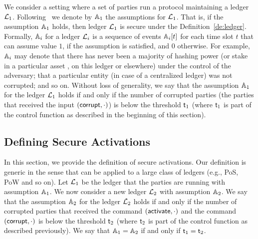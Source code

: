 We consider a setting where a set of parties run a protocol maintaining a ledger $\mathcal{L}_1$. Following~\cite{sidechain} we denote by $\mathbb{A}_1$
the assumptions for $\mathcal{L}_1$.
 That is, if the assumption $\mathbb{A}_1$ holds, then ledger $\mathcal{L}_1$ is secure under the Definition~\ref{de:ledger}.
Formally, $\mathbb{A}_i$ for a ledger $\mathcal{L}_i$ is a sequence of events $\mathbb{A}_i[t]$ for each time slot $t$ that can assume value $1$,
if the assumption is satisfied, and $0$ otherwise.
For example, $\mathbb{A}_i$ may denote that
there has never been a majority of hashing power (or stake in a particular
asset
, on this ledger or elsewhere) under the control of the adversary; that a
particular entity (in case of a centralized ledger) was not corrupted; and so
on.
Without loss of generality, we say that the assumption $\mathbb{A}_1$ for the ledger $\mathcal{L}_1$ holds if and only if the number of corrupted parties (the parties
that received the input $(\mathsf{corrupt}, \cdot)$) is below the threshold $\mathsf{t}_1$ (where $\mathsf{t}_1$ is part of the control function as described in the beginning
of this section).







\subsection{Defining Secure Activations}
In this section, we provide the definition of secure activations. Our definition is generic in the sense that can be applied to a large class of ledgers
(e.g., PoS, PoW and so on).
Let $\mathcal{L}_1$ be the ledger that the parties are running with assumption $\mathbb{A}_1$. We now consider a new ledger $\mathcal{L}_2$ with assumption $\mathbb{A}_2$.
We say that the assumption $\mathbb{A}_2$ for the ledger $\mathcal{L}_2$ holds if and only if the number of corrupted parties
that received the command $(\mathsf{activate}, \cdot)$ and the command $(\mathsf{corrupt},\cdot)$
 is below the threshold $\mathsf{t}_2$ (where $\mathsf{t}_2$ is part of the control function as described previously).
 We say that $\mathbb{A}_1=\mathbb{A}_2$ if and only if $\mathsf{t}_1=\mathsf{t}_2$.


